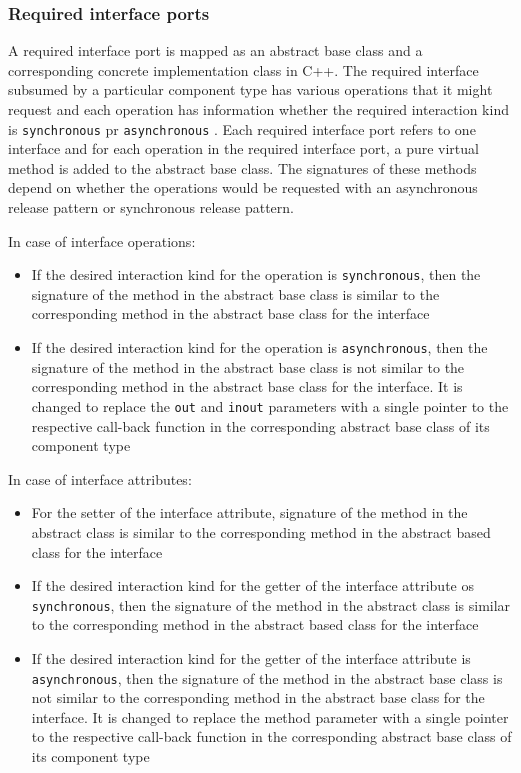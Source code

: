 \subsubsection{\textbf{Required interface ports}}
A required interface port is mapped as an abstract base class and a corresponding concrete implementation class in C++. The required interface subsumed by a particular component type has various operations that it might request and each operation has information whether the required interaction kind is \texttt{synchronous} pr \texttt{asynchronous} \cite{SpecMetamodel,CompBasedProcess}. Each required interface port refers to one interface and for each operation in the required interface port, a pure virtual method is added to the abstract base class. The signatures of these methods depend on whether the operations would be requested with an asynchronous release pattern or synchronous release pattern.

In case of interface operations:
\begin{itemize}
\item If the desired interaction kind for the operation is \texttt{synchronous}, then the signature of the method in the abstract base class is similar to the corresponding method in the abstract base class for the interface
\item If the desired interaction kind for the operation is \texttt{asynchronous}, then the signature of the method in the abstract base class is not similar to the corresponding method in the abstract base class for the interface. It is changed to replace the \texttt{out} and \texttt{inout} parameters with a single pointer to the respective call-back function in the corresponding abstract base class of its component type 
\end{itemize}

In case of interface attributes:
\begin{itemize}
\item For the setter of the interface attribute, signature of the method in the abstract class is similar to the corresponding method in the abstract based class for the interface
\item If the desired interaction kind for the getter of the interface attribute os \texttt{synchronous}, then the signature of the method in the abstract class is similar to the corresponding method in the abstract based class for the interface 
\item If the desired interaction kind for the getter of the interface attribute is \texttt{asynchronous}, then the signature of the method in the abstract base class is not similar to the corresponding method in the abstract base class for the interface. It is changed to replace the method parameter with a single pointer to the respective call-back function in the corresponding abstract base class of its component type  
\end{itemize} 


